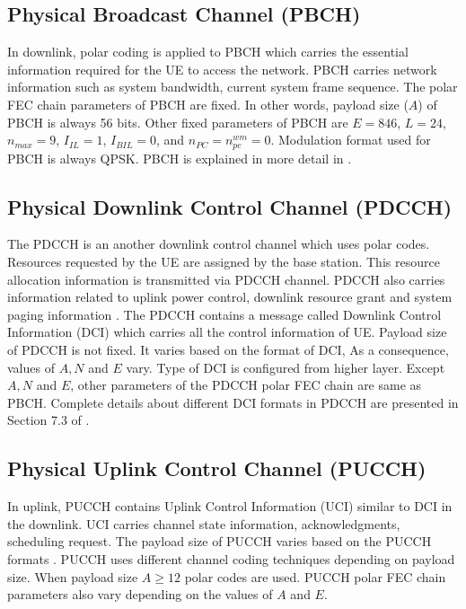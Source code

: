 \subsection{Physical Broadcast Channel (PBCH)}
In downlink, polar coding is applied to PBCH which carries the essential information required for the UE to access the network. PBCH carries network information such as system bandwidth, current system frame sequence. The polar FEC chain parameters of PBCH are fixed. In other words, payload size ($A$) of PBCH is always 56 bits. Other fixed parameters of PBCH are $E = 846$, $L = 24$, $n_{max} = 9$, $I_{IL} = 1$, $I_{BIL} = 0$, and $n_{PC} = n_{pc}^{wm} = 0$. Modulation format used for PBCH is always QPSK. PBCH is explained in more detail in \cite{3gpp.38.212}.

\subsection{Physical Downlink Control Channel (PDCCH)}
The PDCCH is an another downlink control channel which uses polar codes. Resources requested by the UE are assigned by the base station. This resource allocation information is transmitted via PDCCH channel. PDCCH also carries information related to uplink power control, downlink resource grant and system paging information \cite{3gpp.38.211}. The PDCCH contains a message called Downlink Control Information (DCI) which carries all the control information of UE. Payload size of PDCCH is not fixed. It varies based on the format of DCI, As a consequence, values of $A, N$ and $E$ vary. Type of DCI is configured from higher layer. Except $A, N$ and $E$, other parameters of the PDCCH polar FEC chain are same as PBCH. Complete details about different DCI formats in PDCCH are presented in Section 7.3 of \cite{3gpp.38.212}.

\subsection{Physical Uplink Control Channel (PUCCH)}
In uplink, PUCCH contains Uplink Control Information (UCI) similar to DCI in the downlink. UCI carries channel state information, acknowledgments, scheduling request. The payload size of PUCCH varies based on the PUCCH formats \cite{3gpp.38.211}. PUCCH uses different channel coding techniques depending on payload size. When payload size $A \geq 12$ polar codes are used. PUCCH polar FEC chain parameters also vary depending on the values of $A$ and $E$. \newline

